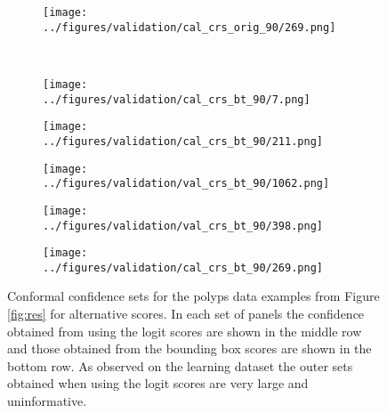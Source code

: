 \begin{figure}[h!]
\begin{subfigure}{0.18\textwidth}
		\label{fig:1}
	\end{subfigure}
	\begin{subfigure}{0.18\textwidth}
		\centering
		\texttt{[image: ../figures/validation/cal\_crs\_orig\_90/269.png]}
		\label{fig:1}
	\end{subfigure}
	\vspace{-0.35cm}
	\\
			\begin{subfigure}[b]{0.03\textwidth} %
		\centering
	\end{subfigure}
	\hspace{0.05cm}
	\begin{subfigure}{0.18\textwidth}
		\centering
		\texttt{[image: ../figures/validation/cal\_crs\_bt\_90/7.png]}
		\label{fig:1}
	\end{subfigure}
	\begin{subfigure}{0.18\textwidth}
		\centering
		\texttt{[image: ../figures/validation/cal\_crs\_bt\_90/211.png]}
		\label{fig:1}
	\end{subfigure}
	\begin{subfigure}{0.18\textwidth}
		\centering
		\texttt{[image: ../figures/validation/val\_crs\_bt\_90/1062.png]}
		\label{fig:1}
	\end{subfigure}
	\begin{subfigure}{0.18\textwidth}
		\centering
		\texttt{[image: ../figures/validation/val\_crs\_bt\_90/398.png]}
		\label{fig:1}
	\end{subfigure}
	\begin{subfigure}{0.18\textwidth}
		\centering
		\texttt{[image: ../figures/validation/cal\_crs\_bt\_90/269.png]}
		\label{fig:1}
	\end{subfigure}
	\label{fig:grid}
	\caption{Conformal confidence sets for the polyps data examples from Figure \ref{fig:res} for alternative scores. In each set of panels the confidence obtained from using the logit scores are shown in the middle row and those obtained from the bounding box scores are shown in the bottom row. As observed on the learning dataset the outer sets obtained when using the logit scores are very large and uninformative.}\label{fig:polpysex}
\end{figure}
\newpage
